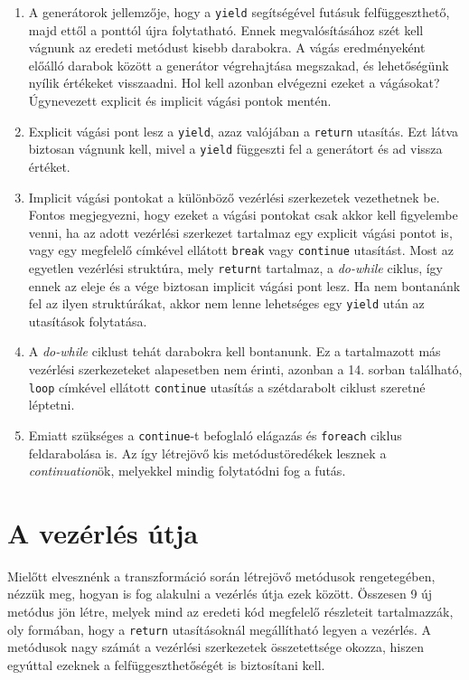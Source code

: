 \documentclass[12pt, a4paper]{article}
\begin{document}
\begin{enumerate}
   \item
   A generátorok jellemzője, hogy a \texttt{yield} segítségével futásuk felfüggeszthető, majd ettől a ponttól újra folytatható. Ennek megvalósításához szét kell vágnunk az eredeti metódust kisebb darabokra. A vágás eredményeként előálló darabok között a generátor végrehajtása megszakad, és lehetőségünk nyílik értékeket visszaadni. Hol kell azonban elvégezni ezeket a vágásokat? Úgynevezett explicit és implicit vágási pontok mentén.
   \item
   Explicit vágási pont lesz a \texttt{yield}, azaz valójában a \texttt{return} utasítás. Ezt látva biztosan vágnunk kell, mivel a \texttt{yield} függeszti fel a generátort és ad vissza értéket.
   \item
   Implicit vágási pontokat a különböző vezérlési szerkezetek vezethetnek be. Fontos megjegyezni, hogy ezeket a vágási pontokat csak akkor kell figyelembe venni, ha az adott vezérlési szerkezet tartalmaz egy explicit vágási pontot is, vagy egy megfelelő címkével ellátott \texttt{break} vagy \texttt{continue} utasítást. Most az egyetlen vezérlési struktúra, mely \texttt{return}t tartalmaz, a \textit{do-while} ciklus, így ennek az eleje és a vége biztosan implicit vágási pont lesz. Ha nem bontanánk fel az ilyen struktúrákat, akkor nem lenne lehetséges egy \texttt{yield} után az utasítások folytatása.
   \item
   A \textit{do-while} ciklust tehát darabokra kell bontanunk. Ez a tartalmazott más vezérlési szerkezeteket alapesetben nem érinti, azonban a 14. sorban található, \texttt{loop} címkével ellátott \texttt{continue} utasítás a szétdarabolt ciklust szeretné léptetni.
   \item
   Emiatt szükséges a \texttt{continue}-t befoglaló elágazás és \texttt{foreach} ciklus feldarabolása is. Az így létrejövő kis metódustöredékek lesznek a \textit{continuation}ök, melyekkel mindig folytatódni fog a futás.
\end{enumerate}

\section{A vezérlés útja}

Mielőtt elvesznénk a transzformáció során létrejövő metódusok rengetegében, nézzük meg, hogyan is fog alakulni a vezérlés útja ezek között. Összesen 9 új metódus jön létre, melyek mind az eredeti kód megfelelő részleteit tartalmazzák, oly formában, hogy a \texttt{return} utasításoknál megállítható legyen a vezérlés. A metódusok nagy számát a vezérlési szerkezetek összetettsége okozza, hiszen egyúttal ezeknek a felfüggeszthetőségét is biztosítani kell.
\end{document}
